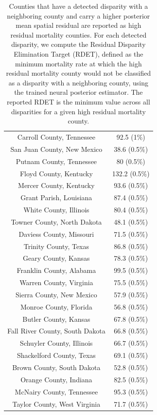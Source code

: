 \begin{table}[ht]
\begin{tabular}{cc}
  Carroll County, Tennessee & 92.5 (1\%) \\ 
  San Juan County, New Mexico & 38.6 (0.5\%) \\ 
  Putnam County, Tennessee & 80 (0.5\%) \\ 
  Floyd County, Kentucky & 132.2 (0.5\%) \\ 
  Mercer County, Kentucky & 93.6 (0.5\%) \\ 
  Grant Parish, Louisiana & 87.4 (0.5\%) \\ 
  White County, Illinois & 80.4 (0.5\%) \\ 
  Towner County, North Dakota & 48.1 (0.5\%) \\ 
  Daviess County, Missouri & 71.5 (0.5\%) \\ 
  Trinity County, Texas & 86.8 (0.5\%) \\ 
  Geary County, Kansas & 78.3 (0.5\%) \\ 
  Franklin County, Alabama & 99.5 (0.5\%) \\ 
  Warren County, Virginia & 75.5 (0.5\%) \\ 
  Sierra County, New Mexico & 57.9 (0.5\%) \\ 
  Monroe County, Florida & 56.8 (0.5\%) \\ 
  Butler County, Kansas & 67.8 (0.5\%) \\ 
  Fall River County, South Dakota & 66.8 (0.5\%) \\ 
  Schuyler County, Illinois & 66.7 (0.5\%) \\ 
  Shackelford County, Texas & 69.1 (0.5\%) \\ 
  Brown County, South Dakota & 52.8 (0.5\%) \\ 
  Orange County, Indiana & 82.5 (0.5\%) \\ 
  McNairy County, Tennessee & 95.3 (0.5\%) \\ 
  Taylor County, West Virginia & 71.7 (0.5\%) \\ 
   \bottomrule
\end{tabular}
\caption{Counties that have a detected disparity with a neighboring county and carry a higher posterior mean spatial residual are reported as high residual mortality counties. For each detected disparity, we compute the Residual Disparity Elimination Target (RDET), defined as the minimum mortality rate at which the high residual mortality county would not be classified as a disparity with a neighboring county, using the trained neural posterior estimator. The reported RDET is the minimum value across all disparities for a given high residual mortality county.} 
\label{tab:min_RDETs}
\end{table}
